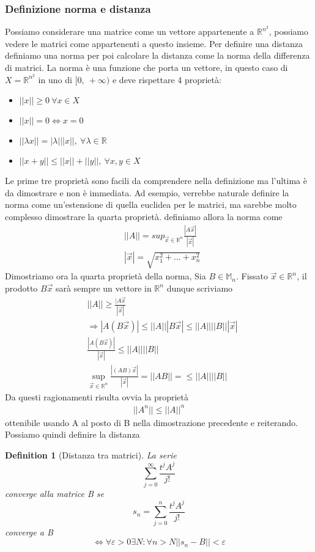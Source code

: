 \documentclass[10pt,a4paper]{article}
\newtheorem{definition}{Definition}
\begin{document}
\subsubsection{Definizione norma e distanza}
Possiamo considerare una matrice come un vettore appartenente a $\mathbb{R}^{n^2}$, possiamo vedere le matrici come appartenenti a questo insieme. Per definire una distanza definiamo una norma per poi calcolare la distanza come la norma della differenza di matrici. La norma è una funzione che porta un vettore, in questo caso di $X=\mathbb{R}^{n^2}$ in uno di $[0,\ +\infty)$ e deve rispettare 4 proprietà:
\begin{itemize}
	\item \(||x|| \geq 0 \ \forall x \in X\)
	\item \(||x|| = 0 \Leftrightarrow x = 0\)
	\item \(||\lambda x|| = |\lambda|||x||,\ \forall \lambda \in \mathbb{R}\)
	\item \(||x+y|| \leq ||x||+||y||, \ \forall x,y \in X\)
\end{itemize}
Le prime tre proprietà sono facili da comprendere nella definizione ma l'ultima è da dimostrare e non è immediata. Ad esempio, verrebbe naturale definire la norma come un'estensione di quella euclidea per le matrici, ma sarebbe molto complesso dimostrare la quarta proprietà. definiamo allora la norma come
\begin{align*}
	&||A|| = sup_{\vec{x}\in \mathbb{R}^n} \frac{|A\vec{x}|}{|\vec{x}|}\\
	&|\vec{x}| = \sqrt{x_1^2+...+x_n^2}
\end{align*}
Dimostriamo ora la quarta proprietà della norma, Sia \(B\in \mathbb{M}_n\). Fissato \(\vec{x}\in \mathbb{R}^n\), il prodotto \(B\vec{x}\) sarà sempre un vettore in $\mathbb{R}^{n}$ dunque scriviamo
\begin{align*}
	&||A|| \geq \frac{|A\vec{x}}{|\vec{x}|}\\
	&\Rightarrow |A(B\vec{x})| \leq ||A|| |B\vec{x}|\leq  ||A|| ||B|| |\vec{x}|\\
	&\frac{|A(B\vec{x})| }{|\vec{x}|}\leq  ||A|| ||B||\\
	&\sup_{\vec{x}\in \mathbb{R}^n} \frac{|(AB)\vec{x}|}{|\vec{x}|} = ||AB|| =\leq  ||A|| ||B||
\end{align*}
Da questi ragionamenti risulta ovvia la proprietà
\begin{align*}
	||A^n|| \leq ||A||^n 
\end{align*}
ottenibile usando A al posto di B nella dimostrazione precedente e reiterando.\\
Possiamo quindi definire la distanza
\begin{definition}[Distanza tra matrici]
	La serie
	 \[\sum_{j=0}^{\infty}\frac{t^j A^j}{j!}\]
	 converge alla matrice B se 
	\[s_n = \sum_{j=0}^{n}\frac{t^j A^j}{j!}\]
	converge a B
	\[\Leftrightarrow \forall \varepsilon > 0 \exists N : \forall n > N ||s_n - B||<\varepsilon\]
\end{definition}
\end{document}
